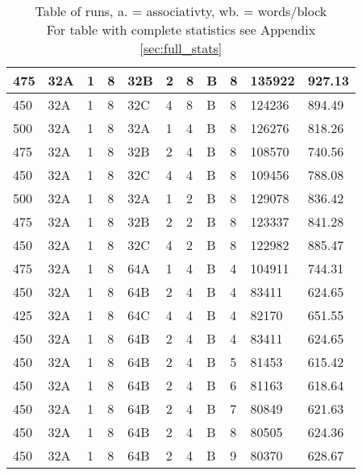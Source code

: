 \begin{table}[H]
\begin{tabular}{|l|l|l|l|l|l|l|l|l|l|l|}
		475	&	32A	&	1	&	8	&	32B	&	2	&	8	&	B	&	8	&	135922	&	927.13\\\hline
		450	&	32A	&	1	&	8	&	32C	&	4	&	8	&	B	&	8	&	124236	&	894.49\\\hline
		500	&	32A	&	1	&	8	&	32A	&	1	&	4	&	B	&	8	&	126276	&	818.26\\\hline
		475	&	32A	&	1	&	8	&	32B	&	2	&	4	&	B	&	8	&	108570	&	740.56\\\hline
		450	&	32A	&	1	&	8	&	32C	&	4	&	4	&	B	&	8	&	109456	&	788.08\\\hline
		500	&	32A	&	1	&	8	&	32A	&	1	&	2	&	B	&	8	&	129078	&	836.42\\\hline
		475	&	32A	&	1	&	8	&	32B	&	2	&	2	&	B	&	8	&	123337	&	841.28\\\hline
		450	&	32A	&	1	&	8	&	32C	&	4	&	2	&	B	&	8	&	122982	&	885.47\\\hline
		\hline
		475	&	32A	&	1	&	8	&	64A	&	1	&	4	&	B	&	4	&	104911	&	744.31\\\hline
		450	&	32A	&	1	&	8	&	64B	&	2	&	4	&	B	&	4	&	83411	&	624.65\\\hline
		425	&	32A	&	1	&	8	&	64C	&	4	&	4	&	B	&	4	&	82170	&	651.55\\\hline
		\hline
		450	&	32A	&	1	&	8	&	64B	&	2	&	4	&	B	&	4	&	83411	&	624.65\\\hline
		450	&	32A	&	1	&	8	&	64B	&	2	&	4	&	B	&	5	&	81453	&	615.42\\\hline
		450	&	32A	&	1	&	8	&	64B	&	2	&	4	&	B	&	6	&	81163	&	618.64\\\hline
		450	&	32A	&	1	&	8	&	64B	&	2	&	4	&	B	&	7	&	80849	&	621.63\\\hline
		450	&	32A	&	1	&	8	&	64B	&	2	&	4	&	B	&	8	&	80505	&	624.36\\\hline
		450	&	32A	&	1	&	8	&	64B	&	2	&	4	&	B	&	9	&	80370	&	628.67\\\hline
		\end{tabular}
	\caption{Table of runs, a. = associativty, wb. = words/block \\
	For table with complete statistics see Appendix \ref{sec:full_stats}}
	\label{offest_table}
\end{table}